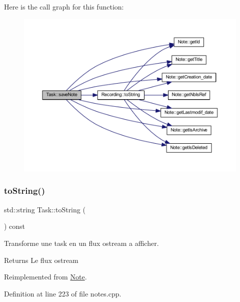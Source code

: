 Here is the call graph for this function\+:\nopagebreak
\begin{figure}[H]
\begin{center}
\leavevmode
\includegraphics[width=350pt]{class_task_a313eb342d047e8e5cab91bf51609a2f3_cgraph}
\end{center}
\end{figure}
\mbox{\label{class_task_a7fe5cb7b57a21693e7abfea2f9618563}} 
\subsubsection{\texorpdfstring{to\+String()}{toString()}}
{\footnotesize\ttfamily std\+::string Task\+::to\+String (\begin{DoxyParamCaption}{ }\end{DoxyParamCaption}) const\hspace{0.3cm}{\ttfamily [virtual]}}



Transforme une task en un flux ostream a afficher. 

\begin{DoxyReturn}{Returns}
Le flux ostream 
\end{DoxyReturn}


Reimplemented from \hyperlink{class_note_a1bd4acfbde0b71d05fd7d4ca889bca2b}{Note}.



Definition at line 223 of file notes.\+cpp.

